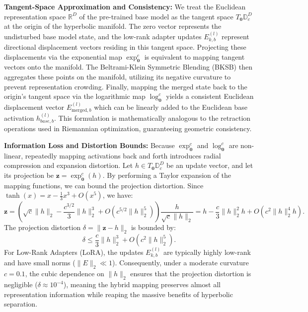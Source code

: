 \textbf{Tangent-Space Approximation and Consistency:} We treat the Euclidean representation space $\mathbb{R}^D$ of the pre-trained base model as the tangent space $T_{\mathbf{0}}\mathbb{D}_c^D$ at the origin of the hyperbolic manifold. The zero vector represents the undisturbed base model state, and the low-rank adapter updates $E_{k, b}^{(l)}$ represent directional displacement vectors residing in this tangent space. Projecting these displacements via the exponential map $\exp_{\mathbf{0}}^c$ is equivalent to mapping tangent vectors onto the manifold. The Beltrami-Klein Symmetric Blending (BKSB) then aggregates these points on the manifold, utilizing its negative curvature to prevent representation crowding. Finally, mapping the merged state back to the origin's tangent space via the logarithmic map $\log_{\mathbf{0}}^c$ yields a consistent Euclidean displacement vector $E_{\text{merged}, b}^{(l)}$ which can be linearly added to the Euclidean base activation $h_{base, b}^{(l)}$. This formulation is mathematically analogous to the retraction operations used in Riemannian optimization, guaranteeing geometric consistency.

\textbf{Information Loss and Distortion Bounds:} Because $\exp_{\mathbf{0}}^c$ and $\log_{\mathbf{0}}^c$ are non-linear, repeatedly mapping activations back and forth introduces radial compression and expansion distortion. Let $h \in T_{\mathbf{0}}\mathbb{D}_c^D$ be an update vector, and let its projection be $\mathbf{z} = \exp_{\mathbf{0}}^c(h)$. By performing a Taylor expansion of the mapping functions, we can bound the projection distortion. Since $\tanh(x) = x - \frac{1}{3}x^3 + O(x^5)$, we have:
\begin{equation}
\mathbf{z} = \left( \sqrt{c}\|h\|_2 - \frac{c^{3/2}}{3}\|h\|_2^3 + O(c^{5/2}\|h\|_2^5) \right) \frac{h}{\sqrt{c}\|h\|_2} = h - \frac{c}{3}\|h\|_2^2 h + O(c^2 \|h\|_2^4 h).
\end{equation}
The projection distortion $\delta = \|\mathbf{z} - h\|_2$ is bounded by:
\begin{equation}
\delta \leq \frac{c}{3}\|h\|_2^3 + O(c^2 \|h\|_2^5).
\end{equation}
For Low-Rank Adapters (LoRA), the updates $E_{k, b}^{(l)}$ are typically highly low-rank and have small norms ($\|E\|_2 \ll 1$). Consequently, under a moderate curvature $c = 0.1$, the cubic dependence on $\|h\|_2$ ensures that the projection distortion is negligible ($\delta \approx 10^{-4}$), meaning the hybrid mapping preserves almost all representation information while reaping the massive benefits of hyperbolic separation.

